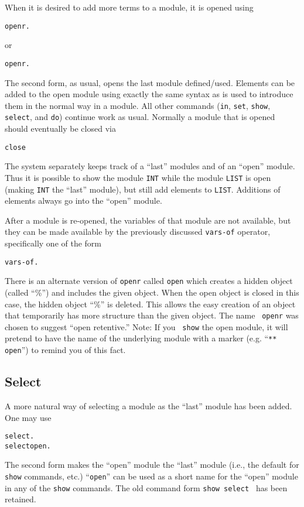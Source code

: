 When it is desired to add more terms to a module, it is opened using
\begin{alltt}
        openr  .
\end{alltt}
or
\begin{alltt}
        openr .
\end{alltt}
The second form, as usual, opens the last module defined/used.
Elements can be added to the open module using exactly the same syntax
as is used to introduce them in the normal way in a module.  All other
commands ({\tt in}, {\tt set}, {\tt show}, {\tt select}, and {\tt do})
continue work as usual.  Normally a module that is opened should
eventually be closed via
\begin{alltt}
        close
\end{alltt}
The system separately keeps track of a ``last'' modules and of an
``open'' module.  Thus it is possible to show the module {\tt INT}
while the module {\tt LIST} is open (making {\tt INT} the ``last''
module), but still add elements to {\tt LIST}.  Additions of elements
always go into the ``open'' module.

After a module is re-opened, the variables of that module are not
available, but they can be made available by the previously discussed
{\tt vars-of} operator, specifically one of the form
\begin{alltt}
        vars-of .
\end{alltt}

There is an alternate version of {\tt openr} called {\tt open} which
creates a hidden object (called ``\%'') and includes the given object.
When the open object is closed in this case, the hidden object ``\%''
is deleted.  This allows the easy creation of an object that
temporarily has more structure than the given object.  The name {\tt
  openr} was chosen to suggest ``open retentive.''  Note: If you {\tt
  show} the open module, it will pretend to have the name of the
underlying module with a marker (e.g. ``{\tt *** open}'') to remind
you of this fact.

\subsection{Select}
A more natural way of selecting a module as the ``last'' module has
been added.  One may use
\begin{alltt}
        select \lopt {}  \ropt .
        select open .
\end{alltt}
The second form makes the ``open'' module the ``last'' module (i.e.,
the default for {\tt show} commands, etc.)  ``{\tt open}'' can be used
as a short name for the ``open'' module in any of the {\tt show}
commands.  The old command form {\tt show select } has been
retained.

